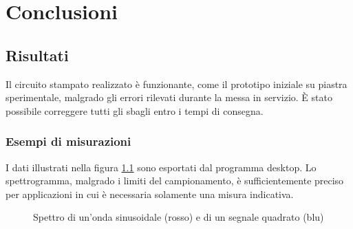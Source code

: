 \chapter{Conclusioni}
\section{Risultati}
Il circuito stampato realizzato \`e funzionante, come il prototipo iniziale su
piastra sperimentale, malgrado gli errori rilevati durante la messa in
servizio. \`E stato possibile correggere tutti gli sbagli entro i tempi di
consegna.


\subsection{Esempi di misurazioni}
I dati illustrati nella figura \ref{fig:measurements} sono esportati dal
programma desktop. Lo spettrogramma, malgrado i limiti del campionamento, \`e
sufficientemente preciso per applicazioni in cui \`e necessaria solamente una
misura indicativa.
\begin{figure}[H] \centering
    \caption{
        Spettro di un'onda sinusoidale (rosso) e di un segnale quadrato (blu)
        \label{fig:measurements}
    }
\end{figure}

